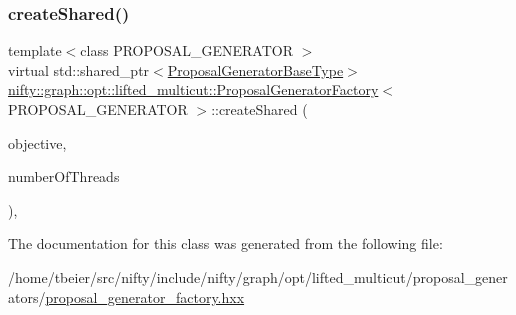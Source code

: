 \mbox{\label{classnifty_1_1graph_1_1opt_1_1lifted__multicut_1_1ProposalGeneratorFactory_a019bdd023454d694d29a8a085bef833a}} 
\subsubsection{\texorpdfstring{create\+Shared()}{createShared()}}
{\footnotesize\ttfamily template$<$class P\+R\+O\+P\+O\+S\+A\+L\+\_\+\+G\+E\+N\+E\+R\+A\+T\+OR $>$ \\
virtual std\+::shared\+\_\+ptr$<$\hyperlink{classnifty_1_1graph_1_1opt_1_1lifted__multicut_1_1ProposalGeneratorFactory_adbef9a4dba21ef9517233d4e74b4933f}{Proposal\+Generator\+Base\+Type}$>$ \hyperlink{classnifty_1_1graph_1_1opt_1_1lifted__multicut_1_1ProposalGeneratorFactory}{nifty\+::graph\+::opt\+::lifted\+\_\+multicut\+::\+Proposal\+Generator\+Factory}$<$ P\+R\+O\+P\+O\+S\+A\+L\+\_\+\+G\+E\+N\+E\+R\+A\+T\+OR $>$\+::create\+Shared (\begin{DoxyParamCaption}\item[{const \hyperlink{classnifty_1_1graph_1_1opt_1_1lifted__multicut_1_1ProposalGeneratorFactory_ae173dfe15e6d1706c8a390c60024cc42}{Objective\+Type} \&}]{objective,  }\item[{const size\+\_\+t}]{number\+Of\+Threads }\end{DoxyParamCaption})\hspace{0.3cm}{\ttfamily [inline]}, {\ttfamily [virtual]}}



The documentation for this class was generated from the following file\+:\begin{DoxyCompactItemize}
\item 
/home/tbeier/src/nifty/include/nifty/graph/opt/lifted\+\_\+multicut/proposal\+\_\+generators/\hyperlink{lifted__multicut_2proposal__generators_2proposal__generator__factory_8hxx}{proposal\+\_\+generator\+\_\+factory.\+hxx}\end{DoxyCompactItemize}
